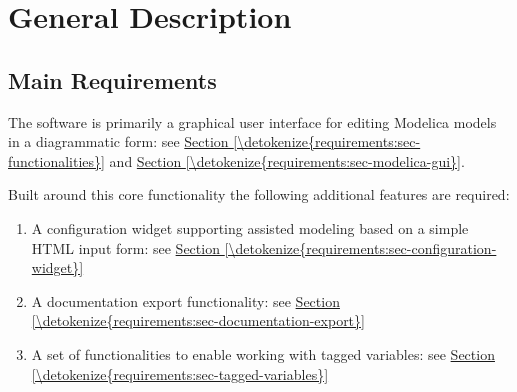 \documentclass[letterpaper,10pt, openany,english]{sphinxmanual}
\begin{document}
\section{General Description}
\label{\detokenize{requirements:general-description}}\label{\detokenize{requirements:sec-general-description}}

\subsection{Main Requirements}
\label{\detokenize{requirements:main-requirements}}
The software is primarily a graphical user interface for editing Modelica models in a diagrammatic form: see \hyperref[\detokenize{requirements:sec-functionalities}]{Section \ref{\detokenize{requirements:sec-functionalities}}} and \hyperref[\detokenize{requirements:sec-modelica-gui}]{Section \ref{\detokenize{requirements:sec-modelica-gui}}}.

Built around this core functionality the following additional features are required:
\begin{enumerate}
%
\item {} 
A configuration widget supporting assisted modeling based on a simple HTML input form: see \hyperref[\detokenize{requirements:sec-configuration-widget}]{Section \ref{\detokenize{requirements:sec-configuration-widget}}}

\item {} 
A documentation export functionality: see \hyperref[\detokenize{requirements:sec-documentation-export}]{Section \ref{\detokenize{requirements:sec-documentation-export}}}

\item {} 
A set of functionalities to enable working with tagged variables: see \hyperref[\detokenize{requirements:sec-tagged-variables}]{Section \ref{\detokenize{requirements:sec-tagged-variables}}}

\end{enumerate}
\end{document}
